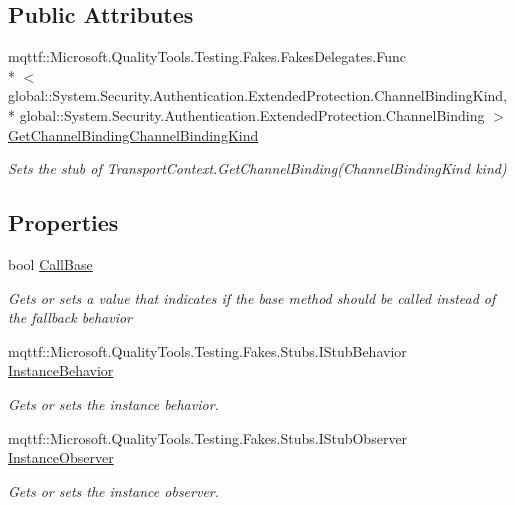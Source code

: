 \subsection*{Public Attributes}
\begin{DoxyCompactItemize}
\item 
mqttf\-::\-Microsoft.\-Quality\-Tools.\-Testing.\-Fakes.\-Fakes\-Delegates.\-Func\\*
$<$ global\-::\-System.\-Security.\-Authentication.\-Extended\-Protection.\-Channel\-Binding\-Kind, \\*
global\-::\-System.\-Security.\-Authentication.\-Extended\-Protection.\-Channel\-Binding $>$ \hyperlink{class_system_1_1_net_1_1_fakes_1_1_stub_transport_context_a5afe278712d173b668e7cd0c46d883b3}{Get\-Channel\-Binding\-Channel\-Binding\-Kind}
\begin{DoxyCompactList}\small\item\em Sets the stub of Transport\-Context.\-Get\-Channel\-Binding(\-Channel\-Binding\-Kind kind)\end{DoxyCompactList}\end{DoxyCompactItemize}
\subsection*{Properties}
\begin{DoxyCompactItemize}
\item 
bool \hyperlink{class_system_1_1_net_1_1_fakes_1_1_stub_transport_context_add4463a74100c17138e6cd8cf83677e6}{Call\-Base}
\begin{DoxyCompactList}\small\item\em Gets or sets a value that indicates if the base method should be called instead of the fallback behavior\end{DoxyCompactList}\item 
mqttf\-::\-Microsoft.\-Quality\-Tools.\-Testing.\-Fakes.\-Stubs.\-I\-Stub\-Behavior \hyperlink{class_system_1_1_net_1_1_fakes_1_1_stub_transport_context_ab626823e3538e16fed231bf4c712eadc}{Instance\-Behavior}
\begin{DoxyCompactList}\small\item\em Gets or sets the instance behavior.\end{DoxyCompactList}\item 
mqttf\-::\-Microsoft.\-Quality\-Tools.\-Testing.\-Fakes.\-Stubs.\-I\-Stub\-Observer \hyperlink{class_system_1_1_net_1_1_fakes_1_1_stub_transport_context_a2386bc6b9a5e2135df5d6df73b7261da}{Instance\-Observer}
\begin{DoxyCompactList}\small\item\em Gets or sets the instance observer.\end{DoxyCompactList}\end{DoxyCompactItemize}


